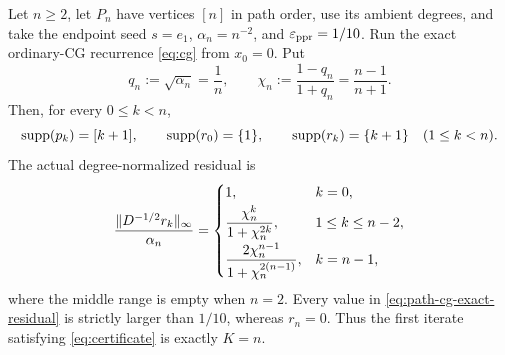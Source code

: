 \documentclass[11pt]{article}
\begin{document}
\begin{theorem}
\label{thm:endpoint-path-exact-cg-certificate}
Let $n\geq2$, let $P_n$ have vertices $[n]$ in path order, use its ambient
degrees, and take the endpoint seed $s=e_1$, $\alpha_n=n^{-2}$, and
$\varepsilon_{\mathrm{ppr}}=1/10$.  Run the exact ordinary-CG recurrence \cref{eq:cg} from
$x_0=0$.  Put
\begin{equation}
 q_n:=\sqrt{\alpha_n}=\frac1n,
 \qquad
 \chi_n:=\frac{1-q_n}{1+q_n}=\frac{n-1}{n+1}.
 \label{eq:path-cg-chi}
\end{equation}
Then, for every $0\leq k<n$,
\begin{equation}
 \operatorname{supp}(p_k)=[k+1],
 \qquad
 \operatorname{supp}(r_0)=\{1\},
 \qquad
 \operatorname{supp}(r_k)=\{k+1\}\quad(1\leq k<n).
 \label{eq:path-cg-exact-supports}
\end{equation}
The actual degree-normalized residual is
\begin{equation}
 \frac{\lVert D^{-1/2}r_k\rVert_\infty}{\alpha_n}
 =
 \begin{cases}
  1, & k=0,\\[2pt]
  \displaystyle\frac{\chi_n^k}{1+\chi_n^{2k}},
     & 1\leq k\leq n-2,\\[7pt]
  \displaystyle\frac{2\chi_n^{n-1}}{1+\chi_n^{2(n-1)}},
     & k=n-1,
 \end{cases}
 \label{eq:path-cg-exact-residual}
\end{equation}
where the middle range is empty when $n=2$.  Every value in
\cref{eq:path-cg-exact-residual} is strictly larger than $1/10$, whereas
$r_n=0$.  Thus the first iterate satisfying \cref{eq:certificate} is exactly
$K=n$.


\end{theorem}
\end{document}
